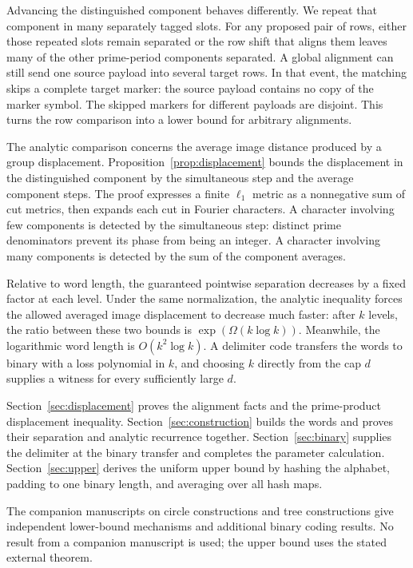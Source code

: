 Advancing the distinguished component behaves differently. We repeat
that component in many separately tagged slots. For any proposed pair
of rows, either those repeated slots remain separated or the row shift
that aligns them leaves many of the other prime-period components
separated. A global alignment can still send one source payload into
several target rows. In that event, the matching skips a complete target
marker: the source payload contains no copy of the marker symbol.
The skipped markers for different payloads are disjoint. This turns
the row comparison into a lower bound for arbitrary alignments.

The analytic comparison concerns the average image distance produced
by a group displacement. Proposition~\ref{prop:displacement} bounds
the displacement in the distinguished component by the simultaneous
step and the average component steps. The proof expresses a finite
$\ell_1$ metric as a nonnegative sum of cut metrics, then expands each
cut in Fourier characters. A character involving few components is
detected by the simultaneous step: distinct prime denominators prevent
its phase from being an integer. A character involving many components
is detected by the sum of the component averages.

Relative to word length, the guaranteed pointwise separation decreases
by a fixed factor at each level. Under the same normalization, the
analytic inequality forces the allowed averaged image displacement
to decrease much faster: after $k$ levels, the ratio between these two
bounds is $\exp(\Omega(k\log k))$. Meanwhile, the logarithmic word
length is $O(k^2\log k)$. A delimiter code transfers the words to binary
with a loss polynomial in $k$, and choosing $k$ directly from the cap $d$
supplies a witness for every sufficiently large $d$.

Section~\ref{sec:displacement} proves the alignment facts and the
prime-product displacement inequality. Section~\ref{sec:construction}
builds the words and proves their separation and analytic recurrence
together. Section~\ref{sec:binary} supplies the delimiter at the
binary transfer and completes the parameter calculation.
Section~\ref{sec:upper} derives the uniform upper bound by hashing the
alphabet, padding to one binary length, and averaging over all hash maps.

The companion manuscripts on circle constructions \cite{OpenAICircle2026}
and tree constructions \cite{OpenAITree2026} give independent lower-bound
mechanisms and additional binary coding results. No result from a companion
manuscript is used; the upper bound uses the stated external theorem.
